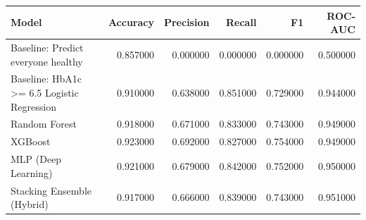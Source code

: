 \begin{tabular}{lrrrrr}
\toprule
Model & Accuracy & Precision & Recall & F1 & ROC-AUC \\
\midrule
Baseline: Predict everyone healthy & 0.857000 & 0.000000 & 0.000000 & 0.000000 & 0.500000 \\
Baseline: HbA1c >= 6.5%
Logistic Regression & 0.910000 & 0.638000 & 0.851000 & 0.729000 & 0.944000 \\
Random Forest & 0.918000 & 0.671000 & 0.833000 & 0.743000 & 0.949000 \\
XGBoost & 0.923000 & 0.692000 & 0.827000 & 0.754000 & 0.949000 \\
MLP (Deep Learning) & 0.921000 & 0.679000 & 0.842000 & 0.752000 & 0.950000 \\
Stacking Ensemble (Hybrid) & 0.917000 & 0.666000 & 0.839000 & 0.743000 & 0.951000 \\
\bottomrule
\end{tabular}
